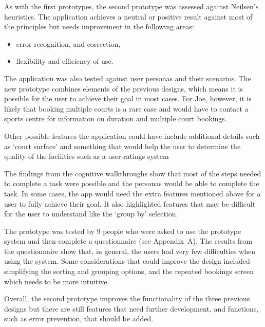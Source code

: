 As with the first prototypes, the second prototype was assessed against
Neilsen’s heuristics. The application achieves a neutral or positive result
against most of the principles but needs improvement in the following areas:
\begin{itemize}
	\item error recognition, and correction,
	\item flexibility and efficiency of use.
\end{itemize}

The application was also tested against user personas and their scenarios. The
new prototype combines elements of the previous designs, which means it is
possible for the user to achieve their goal in most cases. For Joe, however, it
is likely that booking multiple courts is a rare case and would have to contact
a sports centre for information on duration and multiple court bookings.

Other possible features the application could have include additional details
such as `court surface' and something that would help the user to determine the
quality of the facilities such as a user-ratings system

The findings from the cognitive walkthroughs show that most of the steps needed
to complete a task were possible and the personas would be able to complete the
task. In some cases, the app would need the extra features mentioned above for
a user to fully achieve their goal. It also highlighted features that may be
difficult for the user to understand like the `group by' selection.

The prototype was tested by 9 people who were asked to use the prototype
system and then complete a questionnaire (see Appendix~A). The results from the
questionnaire show that, in general, the users had very few difficulties when
using the system. Some considerations that could improve the design included
simplifying the sorting and grouping options, and the repeated bookings screen
which needs to be more intuitive.

Overall, the second prototype improves the functionality of the three previous
designs but there are still features that need further development, and
functions, such as error prevention, that should be added.
